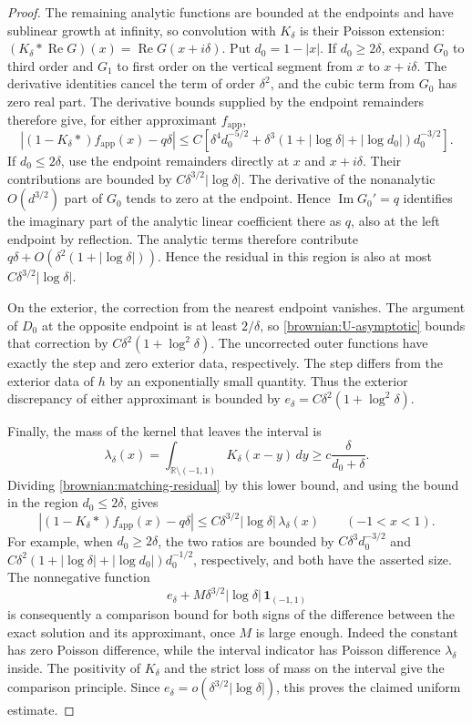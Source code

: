 \begin{proof}
The remaining analytic functions are bounded at the endpoints and
have sublinear growth at infinity, so convolution with $K_\delta$
is their Poisson extension:
$(K_\delta*\operatorname{Re}G)(x)=\operatorname{Re}G(x+i\delta)$.
Put $d_0=1-|x|$.  If $d_0\ge2\delta$, expand $G_0$ to third order
and $G_1$ to first order on the vertical segment from $x$ to
$x+i\delta$.  The derivative identities cancel the term of order
$\delta^2$, and the cubic term from $G_0$ has zero real part.
The derivative bounds supplied by the endpoint remainders therefore
give, for either approximant $f_{\mathrm{app}}$,
\begin{equation}\label{brownian:matching-residual}
 \left|(1-K_\delta*)f_{\mathrm{app}}(x)-q\delta\right|
 \le C\left[
 \delta^4d_0^{-5/2}
 +\delta^3(1+|\log\delta|+|\log d_0|)d_0^{-3/2}
 \right].
\end{equation}
If $d_0\le2\delta$, use the endpoint remainders directly at
$x$ and $x+i\delta$.  Their contributions are bounded by
$C\delta^{3/2}|\log\delta|$.  The derivative of the nonanalytic
$O(d^{3/2})$ part of $G_0$ tends to zero at the endpoint.  Hence
$\operatorname{Im}G_0'=q$ identifies the imaginary part of the analytic
linear coefficient there as $q$, also at the left endpoint by reflection.
The analytic terms therefore contribute
$q\delta+O(\delta^2(1+|\log\delta|))$.
Hence the residual in this region is also at most
$C\delta^{3/2}|\log\delta|$.

On the exterior, the correction from the nearest endpoint vanishes.
The argument of $D_0$ at the opposite endpoint is at least
$2/\delta$, so \eqref{brownian:U-asymptotic} bounds that correction
by $C\delta^2(1+\log^2\delta)$.  The uncorrected outer functions
have exactly the step and zero exterior data, respectively.
The step differs from the exterior data of $h$ by an exponentially
small quantity.  Thus the exterior discrepancy of either approximant
is bounded by
$e_\delta=C\delta^2(1+\log^2\delta)$.

Finally, the mass of the kernel that leaves the interval is
\[
 \lambda_\delta(x)
  =\int_{\mathbb R\setminus(-1,1)}K_\delta(x-y)\,dy
  \ge c\frac{\delta}{d_0+\delta}.
\]
Dividing \eqref{brownian:matching-residual} by this lower bound,
and using the bound in the region $d_0\le2\delta$, gives
\[
 \left|(1-K_\delta*)f_{\mathrm{app}}(x)-q\delta\right|
 \le C\delta^{3/2}|\log\delta|\,\lambda_\delta(x)
 \qquad(-1<x<1).
\]
For example, when $d_0\ge2\delta$, the two ratios are bounded by
$C\delta^3d_0^{-3/2}$ and
$C\delta^2(1+|\log\delta|+|\log d_0|)d_0^{-1/2}$,
respectively, and both have the asserted size.
The nonnegative function
\[
 e_\delta+M\delta^{3/2}|\log\delta|\,
                \mathbf 1_{(-1,1)}
\]
is consequently a comparison bound for both signs of the difference
between the exact solution and its approximant, once $M$ is large
enough.  Indeed the constant has zero Poisson difference, while the
interval indicator has Poisson difference $\lambda_\delta$ inside.
The positivity of $K_\delta$ and the strict loss of mass on the
interval give the comparison principle.  Since
$e_\delta=o(\delta^{3/2}|\log\delta|)$, this proves the claimed
uniform estimate.
\end{proof}

